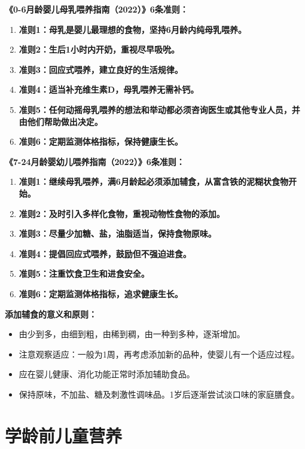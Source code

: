 \begin{keybox}
\textbf{《0-6月龄婴儿母乳喂养指南（2022）》6条准则：}
\begin{enumerate}[leftmargin=*]
    \item \textbf{准则1：母乳是婴儿最理想的食物，坚持6月龄内纯母乳喂养。}
    \item \textbf{准则2：生后1小时内开奶，重视尽早吸吮。}
    \item \textbf{准则3：回应式喂养，建立良好的生活规律。}
    \item \textbf{准则4：适当补充维生素D，母乳喂养无需补钙。}
    \item \textbf{准则5：任何动摇母乳喂养的想法和举动都必须咨询医生或其他专业人员，并由他们帮助做出决定。}
    \item \textbf{准则6：定期监测体格指标，保持健康生长。}
\end{enumerate}

\textbf{《7-24月龄婴幼儿喂养指南（2022）》6条准则：}
\begin{enumerate}[leftmargin=*]
    \item \textbf{准则1：继续母乳喂养，满6月龄起必须添加辅食，从富含铁的泥糊状食物开始。}
    \item \textbf{准则2：及时引入多样化食物，重视动物性食物的添加。}
    \item \textbf{准则3：尽量少加糖、盐，油脂适当，保持食物原味。}
    \item \textbf{准则4：提倡回应式喂养，鼓励但不强迫进食。}
    \item \textbf{准则5：注重饮食卫生和进食安全。}
    \item \textbf{准则6：定期监测体格指标，追求健康生长。}
\end{enumerate}

\textbf{添加辅食的意义和原则：}
\begin{itemize}[leftmargin=*]
    \item 由少到多，由细到粗，由稀到稠，由一种到多种，逐渐增加。
    \item 注意观察适应：一般为1周，再考虑添加新的品种，使婴儿有一个适应过程。
    \item 应在婴儿健康、消化功能正常时添加辅助食品。
    \item 保持原味，不加盐、糖及刺激性调味品。1岁后逐渐尝试淡口味的家庭膳食。
\end{itemize}
\end{keybox}

\section{学龄前儿童营养}

